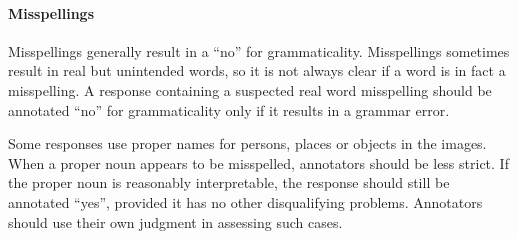 \documentclass[12pt,notitlepage]{article}
\begin{document}
\paragraph{Misspellings} Misspellings generally result in a ``no'' for grammaticality. Misspellings sometimes result in real but unintended words, so it is not always clear if a word is in fact a misspelling. A response containing a suspected real word misspelling should be annotated ``no'' for grammaticality only if it results in a grammar error.

Some responses use proper names for persons, places or objects in the images. When a proper noun appears to be misspelled, annotators should be less strict. If the proper noun is reasonably interpretable, the response should still be annotated ``yes'', provided it has no other disqualifying problems. Annotators should use their own judgment in assessing such cases.

%
%
\end{document}
